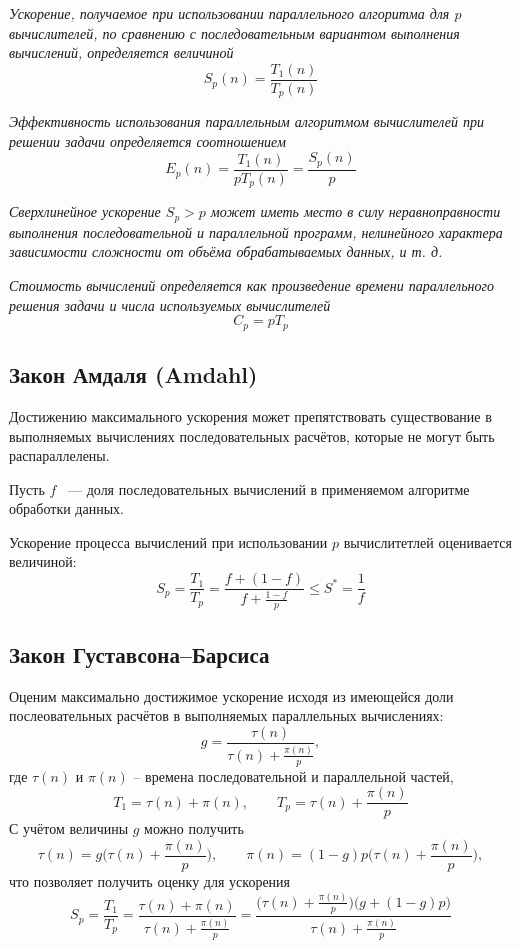 \begin{definition}
	\it{Ускорение}, получаемое при использовании параллельного алгоритма для $ p $ вычислителей, по сравнению с последовательным вариантом выполнения вычислений, определяется величиной
	$$ S_p(n) = \frac{T_1(n)}{T_p(n)} $$
\end{definition}

\begin{definition}
	\it{Эффективность} использования параллельным алгоритмом вычислителей при решении задачи определяется соотношением
	$$ E_p(n) = \frac{T_1(n)}{pT_p(n)} = \frac{S_p(n)}p $$
\end{definition}

\begin{remark}
	\it{Сверхлинейное} ускорение $ S_p > p $ может иметь место в силу неравноправности выполнения последовательной и параллельной программ, нелинейного характера зависимости сложности от объёма обрабатываемых данных, и т. д.
\end{remark}

\begin{definition}
	\it{Стоимость} вычислений определяется как произведение времени параллельного решения задачи и числа используемых вычислителей
	$$ C_p = pT_p $$
\end{definition}

\subsection*{Закон Амдаля (Amdahl)}

Достижению максимального ускорения может препятствовать существование в выполняемых вычислениях последовательных расчётов, которые не могут быть распараллелены.

Пусть $ f $ ~--- доля последовательных вычислений в применяемом алгоритме обработки данных.

Ускорение процесса вычислений при использовании $ p $ вычислитетлей оценивается величиной:
$$ S_p = \frac{T_1}{T_p} = \frac{f + (1 - f)}{f + \frac{1 - f}p} \le S^* = \frac1f $$

\subsection*{Закон Густавсона--Барсиса}

Оценим максимально достижимое ускорение исходя из имеющейся доли послеовательных расчётов в выполняемых параллельных вычислениях:
$$ g = \frac{\tau(n)}{\tau(n) + \frac{\pi(n)}p}, $$
где $ \tau(n) $ и $ \pi(n) $ -- времена последовательной и параллельной частей, \ie
$$ T_1 = \tau(n) + \pi(n), \qquad T_p = \tau(n) + \frac{\pi(n)}p $$
С учётом величины $ g $ можно получить
$$ \tau(n) = g \bigg( \tau(n) + \frac{\pi(n)}p \bigg), \qquad \pi(n) = (1 - g)p \bigg( \tau(n) + \frac{\pi(n)}p \bigg), $$
что позволяет получить оценку для ускорения
$$ S_p = \frac{T_1}{T_p} = \frac{\tau(n) + \pi(n)}{\tau(n) + \frac{\pi(n)}p} = \frac{ \bigg( \tau(n) + \frac{\pi(n)}p \bigg) \bigg( g + (1 - g)p \bigg)}{\tau(n) + \frac{\pi(n)}p} $$

